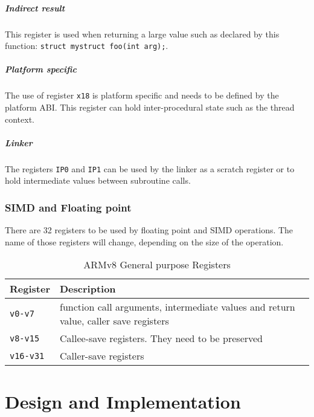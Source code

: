 \documentclass[a4paper,twoside]{report}
\begin{document}
\paragraph{Indirect result} This register is used when returning a large value 
such as declared by this function: \texttt{struct mystruct foo(int arg);}.


\paragraph{Platform specific} The use of register \texttt{x18} is platform 
specific and needs to be defined by the platform ABI. This register can hold
inter-procedural state such as the thread context. 

\paragraph{Linker} The registers \texttt{IP0} and \texttt{IP1} can be used by the 
linker as a scratch register or to hold intermediate values between subroutine 
calls.

\subsection{SIMD and Floating point}
There are 32 registers to be used by floating point and SIMD operations. The name 
of those registers will change, depending on the size of the operation.

\begin{table}[!h]
    \begin{center}
        
        \begin{tabular}{ll}
            \textbf{Register} & \textbf{Description} \\
            \hline
            \texttt{v0-v7}   & function call arguments, intermediate values and 
                               return value, caller save registers \\
            \texttt{v8-v15}  & Callee-save registers. They need to be 
            preserved\\
            \texttt{v16-v31} & Caller-save registers
        \end{tabular}
        \caption{ARMv8 General purpose Registers}
        \label{tab:registers}
    \end{center}
\end{table}

\chapter{Design and Implementation}\label{c:design}
\end{document}
